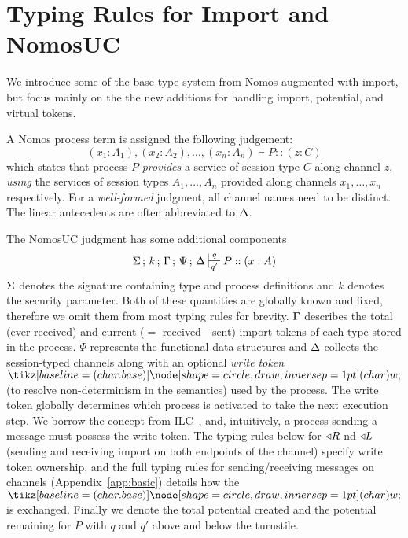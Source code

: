 \section{Typing Rules for Import and NomosUC}
We introduce some of the base type system from Nomos augmented with import, but focus mainly on the the new additions for handling import, potential, and virtual tokens. 

A Nomos process term is assigned the following judgement: 
\[
(x_1 : A_1), (x_2 : A_2), \ldots, (x_n : A_n) \vdash P :: (z : C)
\]
which states that process $P$ \emph{provides} a service
of session type $C$ along channel $z$, \emph{using} the services of session
types $A_1, \ldots, A_n$ provided along channels $x_1, \ldots, x_n$ respectively.
For a \emph{well-formed} judgment, all channel names need to be distinct.
The linear antecedents are often abbreviated to $\Delta$.

The NomosUC judgment has some additional components
\[
\Sg \semi k \semi \Tokens \semi \Psi \semi \D \entailpot{q}{q'} P :: (x : A)
\]
$\Sigma$ denotes the signature containing type and process definitions and $k$
denotes the security parameter.
Both of these quantities are globally known and fixed, therefore we omit them from
most typing rules for brevity.
$\Gamma$ describes the total (ever received) and current ($=$ received - sent) import tokens
of each type stored in the process.
$\Psi$ represents the functional data structures and $\Delta$ collects the
session-typed channels along with an optional \emph{write token} $\wt$
(to resolve non-determinism in the semantics) used by the process.  
The write token globally determines which process is activated to take the next execution step.
We borrow the concept from ILC~\cite{ilc}, and, intuitively, a process sending a message must possess the write token. 
The typing rules below for $\triangleleft R$ nd $\triangleleft L$ (sending and receiving import on both endpoints of the channel) specify write token ownership, and the full typing rules for sending/receiving messages on channels (Appendix~\ref{app:basic}) details how the $\wt$ is exchanged.
Finally we denote the total potential created and the potential remaining for $P$ with $q$ and $q'$ above and below the turnstile.

